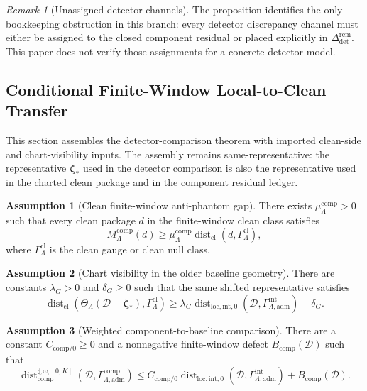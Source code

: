 \documentclass[11pt]{article}
\numberwithin{equation}{section}
\theoremstyle{definition}
\newtheorem{assumption}[assumption]{Assumption}
\theoremstyle{remark}
\newtheorem{remark}[remark]{Remark}
\newcommand{\loc}{\mathrm{loc}}
\newcommand{\adm}{\mathrm{adm}}
\newcommand{\cl}{\mathrm{cl}}
\newcommand{\comp}{\mathrm{comp}}
\newcommand{\detc}{\mathrm{det}}
\newcommand{\Dist}{\operatorname{dist}}
\newcommand{\calD}{\mathcal D}
\newcommand{\bzeta}{\boldsymbol\zeta}
\newcommand{\Gcomp}{\Gamma_{\Lambda,\adm}^{\comp}}
\begin{document}
\begin{remark}[Unassigned detector channels]
The proposition identifies the only bookkeeping obstruction in this branch:
every detector discrepancy channel must either be assigned to the closed
component residual or placed explicitly in
\(\Delta_{\detc}^{\mathrm{rem}}\).  This paper does not verify those assignments
for a concrete detector model.
\end{remark}

\subsection{Conditional Finite-Window Local-to-Clean Transfer}
\label{sec:assembly}

This section assembles the detector-comparison theorem with imported clean-side
and chart-visibility inputs.  The assembly remains same-representative: the
representative \(\bzeta_*\) used in the detector comparison is also the
representative used in the charted clean package and in the component residual
ledger.

\begin{assumption}[Clean finite-window anti-phantom gap]
\label{ass:clean-gap}
There exists \(\mu_{\Lambda}^{\comp}>0\) such that every clean package \(d\)
in the finite-window clean class satisfies
\[
    M_{\Lambda}^{\comp}(d)
    \ge
    \mu_{\Lambda}^{\comp}
    \Dist_{\cl}(d,\Gamma_{\Lambda}^{\cl}),
 \]
where \(\Gamma_{\Lambda}^{\cl}\) is the clean gauge or clean null class.
\end{assumption}

\begin{assumption}[Chart visibility in the older baseline geometry]
\label{ass:chart-visibility}
There are constants \(\lambda_G>0\) and \(\delta_G\ge0\) such that the same
shifted representative satisfies
\[
    \Dist_{\cl}
    (\Theta_{\Lambda}(\calD-\bzeta_*),\Gamma_{\Lambda}^{\cl})
    \ge
    \lambda_G
    \Dist_{\loc,\mathrm{int},0}(\calD,\Gamma_{\Lambda,\adm}^{\mathrm{int}})
    -
    \delta_G.
\]
\end{assumption}

\begin{assumption}[Weighted component-to-baseline comparison]
\label{ass:component-to-baseline}
There are a constant \(C_{\mathrm{comp}/0}\ge0\) and a nonnegative finite-window
defect \(B_{\comp}(\calD)\) such that
\[
    \Dist_{\comp}^{\sharp,\omega,[0,K]}(\calD,\Gcomp)
    \le
    C_{\mathrm{comp}/0}
    \Dist_{\loc,\mathrm{int},0}(\calD,\Gamma_{\Lambda,\adm}^{\mathrm{int}})
    +
    B_{\comp}(\calD).
\]
\end{assumption}
\end{document}
